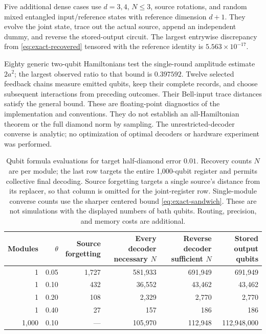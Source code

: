 \documentclass[11pt]{article}
\numberwithin{equation}{section}
\theoremstyle{remark}
\begin{document}
Five additional dense cases use \(d=3,4\), \(N\le3\), source rotations, and
random mixed entangled input/reference states with reference dimension
\(d+1\). They evolve the joint state, trace out the actual source, append an
independent dummy, and reverse the stored-output circuit. The largest
entrywise discrepancy from \eqref{eq:exact-recovered} tensored with the
reference identity is \(5.563\times10^{-17}\).

Eighty generic two-qubit Hamiltonians test the single-round amplitude
estimate \(2a^2\); the largest observed ratio to that bound is \(0.397592\).
Twelve selected feedback chains measure emitted qubits, keep their complete
records, and choose subsequent interactions from preceding outcomes. Their
Bell-input trace distances satisfy the general bound. These are
floating-point diagnostics of the implementation and conventions. They
do not establish an all-Hamiltonian theorem or the full diamond norm by
sampling. The unrestricted-decoder converse is analytic; no optimization of
optimal decoders or hardware experiment was performed.

\begin{table}[!htbp]
 \centering\small
 \begin{tabular}{@{}rrrrrr@{}}
 \toprule
 Modules & \(\theta\) & \shortstack{Source\\forgetting} &
 \shortstack{Every decoder\\necessary \(N\)} &
 \shortstack{Reverse decoder\\sufficient \(N\)} &
 \shortstack{Stored output\\qubits}\\
 \midrule
 1 & 0.05 & 1,727 & 581,933 & 691,949 & 691,949\\
 1 & 0.10 & 432   & 36,552  & 43,462  & 43,462\\
 1 & 0.20 & 108   & 2,329   & 2,770   & 2,770\\
 1 & 0.40 & 27    & 157     & 186     & 186\\
 1,000 & 0.10 & --- & 105,970 & 112,948 & 112,948,000\\
 \bottomrule
 \end{tabular}
 \caption{Qubit formula evaluations for target half-diamond error \(0.01\).
 Recovery counts \(N\) are per module; the last row targets the entire
 1,000-qubit register and permits collective final decoding. Source forgetting
 targets a single source's distance from its replacer, so that column is
 omitted for the joint-register row. Single-module converse counts use the
 sharper centered bound \eqref{eq:exact-sandwich}. These are not simulations
 with the displayed numbers of bath qubits. Routing, precision, and memory
 costs are additional.}
 \label{tab:counts}
\end{table}
\end{document}
